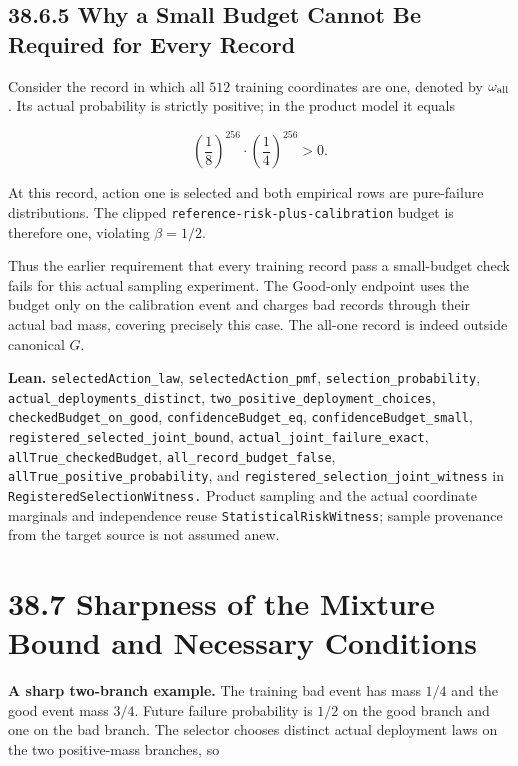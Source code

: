 \documentclass[
  english,
  11pt,
  oneside]{book}
\begin{document}
\subsection{38.6.5 Why a Small Budget Cannot Be Required for Every Record}\label{why-a-small-budget-cannot-be-required-for-every-record}

Consider the record in which all \(512\) training coordinates are one, denoted by \(\omega_{\rm all}\). Its actual probability is strictly positive; in the product model it equals

\[\left(\frac18\right)^{256}\cdot
\left(\frac14\right)^{256}>0.\]

At this record, action one is selected and both empirical rows are pure-failure distributions. The clipped \nolinkurl{reference-risk-plus-calibration} budget is therefore one, violating \(\beta=1/2\).

Thus the earlier requirement that every training record pass a small-budget check fails for this actual sampling experiment. The Good-only endpoint uses the budget only on the calibration event and charges bad records through their actual bad mass, covering precisely this case. The all-one record is indeed outside canonical \(G\).

\textbf{Lean.} \nolinkurl{selectedAction_law}, \nolinkurl{selectedAction_pmf}, \nolinkurl{selection_probability}, \nolinkurl{actual_deployments_distinct}, \nolinkurl{two_positive_deployment_choices}, \nolinkurl{checkedBudget_on_good}, \nolinkurl{confidenceBudget_eq}, \nolinkurl{confidenceBudget_small}, \nolinkurl{registered_selected_joint_bound}, \nolinkurl{actual_joint_failure_exact}, \nolinkurl{allTrue_checkedBudget}, \nolinkurl{all_record_budget_false}, \nolinkurl{allTrue_positive_probability}, and \nolinkurl{registered_selection_joint_witness} in \nolinkurl{RegisteredSelectionWitness.} Product sampling and the actual coordinate marginals and independence reuse \nolinkurl{StatisticalRiskWitness}; sample provenance from the target source is not assumed anew.

\section{38.7 Sharpness of the Mixture Bound and Necessary Conditions}\label{sharpness-of-the-mixture-bound-and-necessary-conditions}

\textbf{A sharp two-branch example.} The training bad event has mass \(1/4\) and the good event mass \(3/4\). Future failure probability is \(1/2\) on the good branch and one on the bad branch. The selector chooses distinct actual deployment laws on the two positive-mass branches, so
\end{document}
